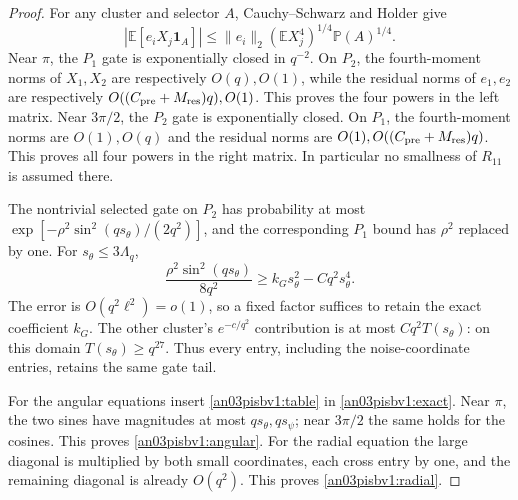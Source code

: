 \documentclass[11pt]{article}
\numberwithin{equation}{section}
\theoremstyle{remark}\newtheorem{remark}[theorem]{Remark}
\newcommand{\E}{\mathbb E}
\newcommand{\one}{\mathbf1}
\begin{document}
\begin{proof}
For any cluster and selector $A$, Cauchy--Schwarz and Holder give
\[
 |\E[e_iX_j\one_A]|
 \le \|e_i\|_2(\E X_j^4)^{1/4}\mathbb P(A)^{1/4}.
\]
Near $\pi$, the $P_1$ gate is exponentially closed in $q^{-2}$.
On $P_2$, the fourth-moment norms of $X_1,X_2$ are respectively
$O(q),O(1)$, while the residual norms of $e_1,e_2$ are respectively
$O((C_{\rm pre}+M_{\rm res})q),O(1)$.
This proves the four powers in the left matrix.
Near $3\pi/2$, the $P_2$ gate is exponentially closed.
On $P_1$, the fourth-moment norms are $O(1),O(q)$ and the residual
norms are $O(1),O((C_{\rm pre}+M_{\rm res})q)$.
This proves all four powers in the right matrix.
In particular no smallness of $R_{11}$ is assumed there.

The nontrivial selected gate on $P_2$ has probability at most
$\exp[-\rho^2\sin^2(qs_\theta)/(2q^2)]$, and the corresponding
$P_1$ bound has $\rho^2$ replaced by one. For
$s_\theta\le3\Lambda_q$,
\[
 \frac{\rho^2\sin^2(qs_\theta)}{8q^2}
 \ge k_Gs_\theta^2-Cq^2s_\theta^4 .
\]
The error is $O(q^2\ell^2)=o(1)$, so a fixed factor suffices to
retain the exact coefficient $k_G$. The other cluster's
$e^{-c/q^2}$ contribution is at most $Cq^2T(s_\theta)$:
on this domain $T(s_\theta)\ge q^{27}$.
Thus every entry, including the noise-coordinate entries, retains
the same gate tail.

For the angular equations insert \eqref{an03pisbv1:table} in
\eqref{an03pisbv1:exact}. Near $\pi$, the two sines have magnitudes
at most $qs_\theta,qs_\psi$; near $3\pi/2$ the same holds for the
cosines. This proves \eqref{an03pisbv1:angular}.
For the radial equation the large diagonal is multiplied by both
small coordinates, each cross entry by one, and the remaining
diagonal is already $O(q^2)$. This proves \eqref{an03pisbv1:radial}.
\end{proof}
\end{document}
